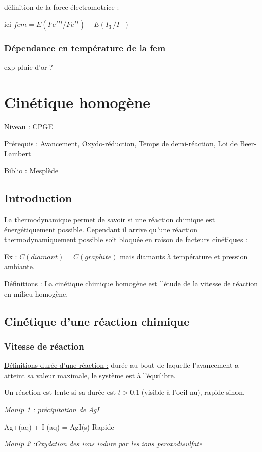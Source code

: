 \documentclass{article}%
\begin{document}
définition de la force électromotrice :

ici $fem=E(Fe^{III}/Fe^{II})-E(I_3^-/I^-)$

\subsubsection{Dépendance en température de la fem}
exp pluie d'or ?

\section{Cinétique homogène}
\underline{Niveau :} CPGE 

\underline{Prérequis :} Avancement, Oxydo-réduction, Temps de demi-réaction, Loi de Beer-Lambert

\underline{Biblio :} Mesplède

\subsection{Introduction}

La thermodynamique permet de savoir si une réaction chimique est énergétiquement possible. Cependant il arrive qu'une réaction thermodynamiquement possible soit bloquée en raison de facteurs cinétiques :

Ex : $C(diamant) = C(graphite)$ mais diamants à température et pression ambiante.

\underline{Définitions :} La cinétique chimique homogène est l'étude de la vitesse de réaction en milieu homogène.

\subsection{Cinétique d'une réaction chimique}
\subsubsection{Vitesse de réaction}
\underline{Définitions durée d’une réaction :} durée au bout de laquelle l’avancement a atteint sa valeur maximale, le système est à l’équilibre.

Un réaction est lente si sa durée est $t>0.1$ (visible à l'oeil nu), rapide sinon.


\textit{Manip 1 : précipitation de AgI}

Ag+(aq) + I-(aq) = AgI(s)
Rapide

\textit{Manip 2 :Oxydation des ions iodure par les ions peroxodisulfate}
\end{document}
